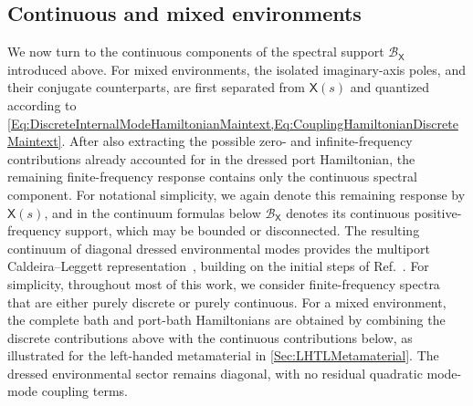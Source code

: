 \documentclass[prx,aps,twocolumn,article]{revtex4-2}
\newcommand{\msf}[1]{\mathsf{#1}}
\newcommand{\msX}{\msf{X}}
\begin{document}
\subsection{Continuous and mixed environments}
\label{Sec:DissipativeEnvs}
We now turn to the continuous components of the spectral support $\mathcal B_{\msX}$ introduced above. For mixed environments, the isolated imaginary-axis poles, and their conjugate counterparts, are first separated from $\msX(s)$ and quantized according to \cref{Eq:DiscreteInternalModeHamiltonianMaintext,Eq:CouplingHamiltonianDiscreteMaintext}. After also extracting the possible zero- and infinite-frequency contributions already accounted for in the dressed port Hamiltonian, the remaining finite-frequency response contains only the continuous spectral component. For notational simplicity, we again denote this remaining response by $\msX(s)$, and in the continuum formulas below $\mathcal B_{\msX}$ denotes its continuous positive-frequency support, which may be bounded or disconnected. The resulting continuum of diagonal dressed environmental modes provides the multiport Caldeira--Leggett representation~\cite{CaldeiraLeggett_DQT:1981,CaldeiraLeggett_QT:1983,Devoret:1997}, building on the initial steps of Ref.~\cite{ParraRodriguez:2025}. For simplicity, throughout most of this work, we consider finite-frequency spectra that are either purely discrete or purely continuous. For a mixed environment, the complete bath and port-bath Hamiltonians are obtained by combining the discrete contributions above with the continuous contributions below, as illustrated for the left-handed metamaterial in \cref{Sec:LHTLMetamaterial}. The dressed environmental sector remains diagonal, with no residual quadratic mode-mode coupling terms.
\end{document}
